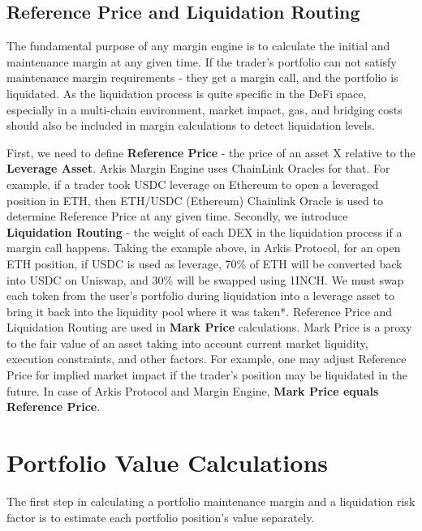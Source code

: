 \documentclass[conference]{IEEEtran}
\begin{document}
\subsection{Reference Price and Liquidation Routing}
The fundamental purpose of any margin engine is to calculate the initial and maintenance margin at any given time. If the trader's portfolio can not satisfy maintenance margin requirements -  they get a margin call, and the portfolio is liquidated. As the liquidation process is quite specific in the DeFi space, especially in a multi-chain environment, market impact, gas, and bridging costs should also be included in margin calculations to detect liquidation levels.

First, we need to define \textbf {Reference Price} - the price of an asset X relative to the \textbf{Leverage Asset}. Arkis Margin Engine uses ChainLink Oracles for that. For example, if a trader took USDC leverage on Ethereum to open a leveraged position in ETH, then ETH/USDC (Ethereum) Chainlink Oracle is used to determine Reference Price at any given time. Secondly, we introduce \textbf {Liquidation Routing} - the weight of each DEX in the liquidation process if a margin call happens. Taking the example above, in Arkis Protocol, for an open ETH position, if USDC is used as leverage, 70\% of ETH will be converted back into USDC on Uniswap, and 30\% will be swapped using 1INCH. We must swap each token from the user's portfolio during liquidation into a leverage asset to bring it back into the liquidity pool where it was taken*. Reference Price and Liquidation Routing are used in \textbf{Mark Price} calculations. Mark Price is a proxy to the fair value of an asset taking into account current market liquidity, execution constraints, and other factors. For example, one may adjust Reference Price for implied market impact if the trader's position may be liquidated in the future. In case of Arkis Protocol and Margin Engine, \textbf{Mark Price equals Reference Price}.

\thispagestyle{fancy}


\section{Portfolio Value Calculations}

The first step in calculating a portfolio maintenance margin and a liquidation risk factor is to estimate each portfolio position's value separately.
\end{document}
